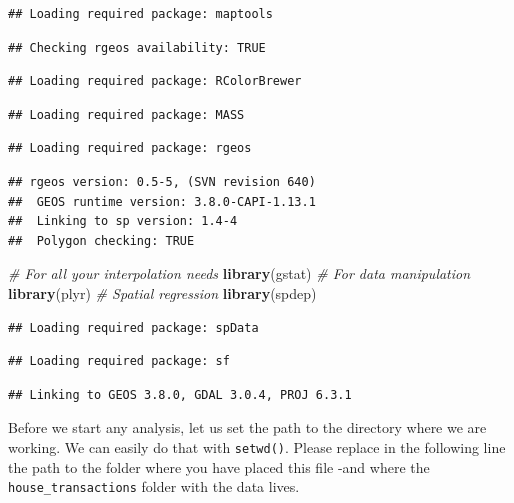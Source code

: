 \documentclass[
]{book}
\newenvironment{Shaded}{\begin{snugshade}}{\end{snugshade}}
\newcommand{\CommentTok}[1]{\textcolor[rgb]{0.56,0.35,0.01}{\textit{#1}}}
\newcommand{\KeywordTok}[1]{\textcolor[rgb]{0.13,0.29,0.53}{\textbf{#1}}}
\newcommand{\NormalTok}[1]{#1}
\begin{document}
\begin{verbatim}
## Loading required package: maptools
\end{verbatim}

\begin{verbatim}
## Checking rgeos availability: TRUE
\end{verbatim}

\begin{verbatim}
## Loading required package: RColorBrewer
\end{verbatim}

\begin{verbatim}
## Loading required package: MASS
\end{verbatim}

\begin{verbatim}
## Loading required package: rgeos
\end{verbatim}

\begin{verbatim}
## rgeos version: 0.5-5, (SVN revision 640)
##  GEOS runtime version: 3.8.0-CAPI-1.13.1 
##  Linking to sp version: 1.4-4 
##  Polygon checking: TRUE
\end{verbatim}

\begin{Shaded}
\begin{Highlighting}[]
\CommentTok{# For all your interpolation needs}
\KeywordTok{library}\NormalTok{(gstat)}
\CommentTok{# For data manipulation}
\KeywordTok{library}\NormalTok{(plyr)}
\CommentTok{# Spatial regression}
\KeywordTok{library}\NormalTok{(spdep)}
\end{Highlighting}
\end{Shaded}

\begin{verbatim}
## Loading required package: spData
\end{verbatim}

\begin{verbatim}
## Loading required package: sf
\end{verbatim}

\begin{verbatim}
## Linking to GEOS 3.8.0, GDAL 3.0.4, PROJ 6.3.1
\end{verbatim}

Before we start any analysis, let us set the path to the directory where we are working. We can easily do that with \texttt{setwd()}. Please replace in the following line the path to the folder where you have placed this file -and where the \texttt{house\_transactions} folder with the data lives.
\end{document}
